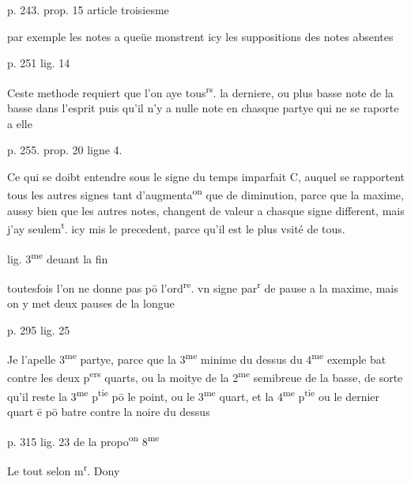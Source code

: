 \documentclass[11pt,a4paper]{article}
\begin{document}
p. 243. prop. 15 article troisiesme

par exemple les notes a queüe monstrent icy les suppositions des notes absentes

p. 251 lig. 14

Ceste methode requiert que l'on aye tous\textsuperscript{rs}. la derniere, ou plus basse note de la basse dans l'esprit puis qu'il n'y a nulle note en chasque partye qui ne se raporte a elle

p. 255. prop. 20 ligne 4.

Ce qui se doibt entendre sous le signe du temps imparfait C, auquel se rapportent tous les autres signes tant d'augmenta\textsuperscript{on} que de diminution, parce que la maxime, aussy bien que les autres notes, changent de valeur a chasque signe different, mais j'ay seulem\textsuperscript{t}. icy mis le precedent, parce qu'il est le plus vsité de tous.

lig. 3\textsuperscript{me} deuant la fin

toutesfois l'on ne donne pas pō l'ord\textsuperscript{re}. vn signe par\textsuperscript{r} de pause a la maxime, mais on y met deux pauses de la longue

p. 295 lig. 25

Je l'apelle 3\textsuperscript{me} partye, parce que la 3\textsuperscript{me} minime du dessus du 4\textsuperscript{me} exemple bat contre les deux p\textsuperscript{ers} quarts, ou la moitye de la 2\textsuperscript{me} semibreue de la basse, de sorte qu'il reste la 3\textsuperscript{me} p\textsuperscript{tie} pō le point, ou le 3\textsuperscript{me} quart, et la 4\textsuperscript{me} p\textsuperscript{tie} ou le dernier quart ē pō batre contre la noire du dessus

p. 315 lig. 23 de la propo\textsuperscript{on} 8\textsuperscript{me}


Le tout selon m\textsuperscript{r}. Dony

\end{document}
